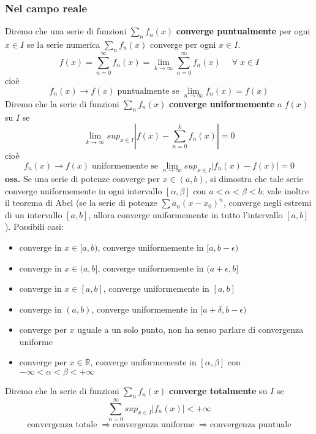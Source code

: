 \subsubsection*{Nel campo reale}
Diremo che una serie di funzioni $\sum_{n}f_n(x)$ \textbf{converge puntualmente} per ogni $x \in I$ se la serie numerica $\sum_{n}f_n(x)$ converge per ogni $x \in I$.
\[
    f(x) = \sum_{n=0}^{\infty} f_n(x) = \lim_{k\rightarrow \infty} \sum_{n=0}^{\infty} f_n(x) \quad \;\forall\;x \in I
\]
cioè
\[
    f_n(x) \rightarrow f(x) \; \text{puntualmente se}\; \lim_{n\rightarrow \infty} f_n(x) = f(x) 
\]
\newline
Diremo che la serie di funzioni $\sum_{n}f_n(x)$ \textbf{converge uniformemente} a $f(x)$ su $I$ se
\[
    \lim_{k\rightarrow \infty} sup_{x \in I}\left| f(x) - \sum_{n=0}^{k}f_n(x) \right| = 0
\]
cioè
\[
    f_n(x) \rightarrow f(x) \; \text{uniformemente se}\; \lim_{n\rightarrow \infty} sup_{x \in I}\left| f_n(x) - f(x) \right| = 0
\]
\textbf{oss.} Se una serie di potenze converge per $x \in (a,b)$, si dimostra che tale serie converge uniformemente in ogni intervallo $[\alpha, \beta]$ con $a < \alpha< \beta < b$; vale inoltre il teorema di Abel (se la serie di potenze $\sum a_n (x-x_0)^n$, converge negli estremi di un intervallo $[a,b]$, allora converge uniformemente in tutto l'intervallo $[a,b]$). Possibili casi:
\begin{itemize}
    \item converge in $x \in[a,b)$, converge uniformemente in $[a, b-\epsilon)$
    \item converge in $x \in(a,b]$, converge uniformemente in $(a + \epsilon, b]$
    \item converge in $x \in[a,b]$, converge uniformemente in $[a, b]$
    \item converge in $(a,b)$, converge uniformemente in $[a + \delta, b-\epsilon)$
    \item converge per $x$ uguale a un solo punto, non ha senso parlare di convergenza uniforme
    \item converge per $x \in\mathbb{R}$, converge uniformemente in $[\alpha, \beta]$ con $-\infty < \alpha < \beta < + \infty$
\end{itemize}
Diremo che la serie di funzioni $\sum_{n}f_n(x)$ \textbf{converge totalmente} su $I$ se
\[
    \sum_{n=0}^{\infty} sup_{x \in I}\left| f_n(x) \right| < + \infty
\]
\newline
\[
    \text{convergenza totale}\; \Longrightarrow \text{convergenza uniforme}\; \Longrightarrow \text{convergenza puntuale}
\]
